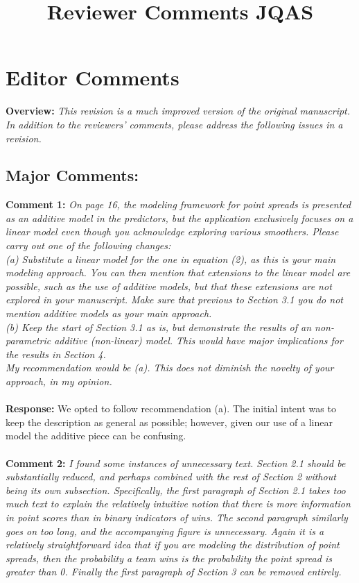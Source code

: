 \documentclass[11pt]{article} %
\title{Reviewer Comments JQAS}
\begin{document}
\maketitle


\section*{Editor Comments}
{\bf Overview:} \emph{This revision is a much improved version of the original manuscript. In addition to the reviewers' comments, please address the following issues in a revision.}
\subsection*{Major Comments:}
{\bf Comment 1: } \emph{On page 16, the modeling framework for point spreads is presented as an additive model in the predictors, but the application exclusively focuses on a linear model even though you acknowledge exploring various smoothers. Please carry out one of the following changes: \\
(a) Substitute a linear model for the one in equation (2), as this is your main modeling approach. You can then mention that extensions to the linear model are possible, such as the use of additive models, but that these extensions are not explored in your manuscript. Make sure that previous to Section 3.1 you do not mention additive models as your main approach.\\
(b) Keep the start of Section 3.1 as is, but demonstrate the results of an non-parametric additive (non-linear) model. This would have major implications for the results in Section 4.\\
My recommendation would be (a). This does not diminish the novelty of your approach, in my opinion.}\\
\\
{\bf Response:} We opted to follow recommendation (a). The initial intent was to keep the description as general as possible; however, given our use of a linear model the additive piece can be confusing.  \\
\\
{\bf Comment 2:} \emph{I found some instances of unnecessary text. Section 2.1 should be substantially reduced, and perhaps combined with the rest of Section 2 without being its own subsection. Specifically, the first paragraph of Section 2.1 takes too much text to explain the relatively intuitive notion that there is more information in point scores than in binary indicators of wins. The second paragraph similarly goes on too long, and the accompanying figure is unnecessary. Again it is a relatively straightforward idea that if you are modeling the distribution of point spreads, then the probability a team wins is the probability the point spread is greater than 0. Finally the first paragraph of Section 3 can be removed entirely.}\\
\end{document}
